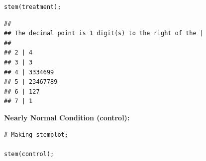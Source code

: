 \begin{example}
\begin{tcolorbox}[colback=gray!10, colframe=black!45, arc=2mm, before skip=4pt, after skip=4pt]
\begin{verbatim}
stem(treatment);
\end{verbatim}
\end{tcolorbox}
\begin{tcolorbox}[colback=gray!10, colframe=black!45, arc=2mm, before skip=4pt, after skip=4pt]
\begin{verbatim}
##
## The decimal point is 1 digit(s) to the right of the |
##
## 2 | 4
## 3 | 3
## 4 | 3334699
## 5 | 23467789
## 6 | 127
## 7 | 1
\end{verbatim}
\end{tcolorbox}
\noindent\textbf{Nearly Normal Condition (control):}
\begin{tcolorbox}[colback=gray!10, colframe=black!45, arc=2mm, before skip=4pt, after skip=4pt]
\begin{verbatim}
# Making stemplot;

stem(control);
\end{verbatim}
\end{tcolorbox}


\end{example}

